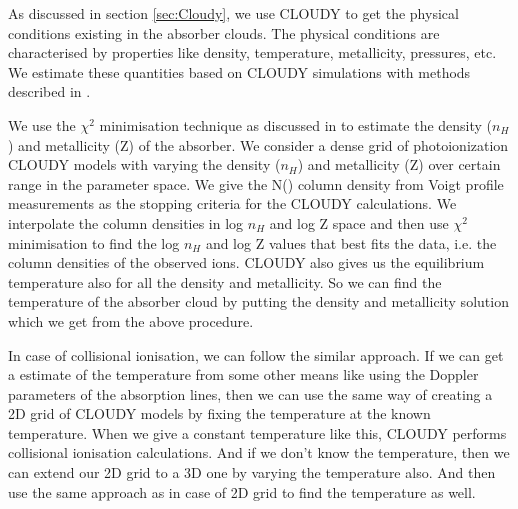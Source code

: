 As discussed in section \ref{sec:Cloudy}, we use CLOUDY to get the physical conditions existing in the absorber clouds. The physical conditions are characterised by properties like density, temperature, metallicity, pressures, etc. We estimate these quantities based on CLOUDY simulations with methods described in \citet{acharya_khaire}.

We use the $\chi^2$ minimisation technique as discussed in \citet{acharya_khaire} to estimate the density ($n_H$) and metallicity (Z) of the absorber. We consider a dense grid of photoionization CLOUDY models with varying the density ($n_H$) and metallicity (Z) over certain range in the parameter space. We give the  N() column density from Voigt profile measurements as the stopping criteria for the CLOUDY calculations. We interpolate the column densities in log $n_H$ and log Z space and then use $\chi^2$ minimisation to find the log $n_H$ and log Z values that best fits the data, i.e. the column densities of the observed ions. CLOUDY also gives us the equilibrium temperature also for all the density and metallicity. So we can find the temperature of the absorber cloud by putting the density and metallicity solution which we get from the above procedure. 

In case of collisional ionisation, we can follow the similar approach. If we can get a estimate of the temperature from some other means like using the Doppler parameters of the absorption lines, then we can use the same way of creating a 2D grid of CLOUDY models by fixing the temperature at the known temperature. When we give a constant temperature like this, CLOUDY performs collisional ionisation calculations. And if we don't know the temperature, then we can extend our 2D grid to a 3D one by varying the temperature also. And then use the same approach as in case of 2D grid to find the temperature as well.





